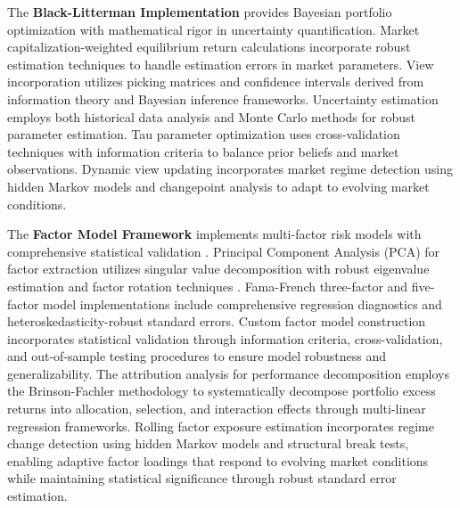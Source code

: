 \documentclass[12pt,a4paper]{article}
\theoremstyle{definition}
\theoremstyle{remark}
\begin{document}
The \textbf{Black-Litterman Implementation} provides Bayesian portfolio optimization with mathematical rigor in uncertainty quantification. Market capitalization-weighted equilibrium return calculations incorporate robust estimation techniques to handle estimation errors in market parameters. View incorporation utilizes picking matrices and confidence intervals derived from information theory and Bayesian inference frameworks. Uncertainty estimation employs both historical data analysis and Monte Carlo methods for robust parameter estimation. Tau parameter optimization uses cross-validation techniques with information criteria to balance prior beliefs and market observations. Dynamic view updating incorporates market regime detection using hidden Markov models and changepoint analysis to adapt to evolving market conditions.

The \textbf{Factor Model Framework} implements multi-factor risk models with comprehensive statistical validation \citep{fama1993common}. Principal Component Analysis (PCA) for factor extraction utilizes singular value decomposition with robust eigenvalue estimation and factor rotation techniques \citep{tsay2010analysis}. Fama-French three-factor and five-factor model implementations include comprehensive regression diagnostics and heteroskedasticity-robust standard errors. Custom factor model construction incorporates statistical validation through information criteria, cross-validation, and out-of-sample testing procedures to ensure model robustness and generalizability. The attribution analysis for performance decomposition employs the Brinson-Fachler methodology to systematically decompose portfolio excess returns into allocation, selection, and interaction effects through multi-linear regression frameworks. Rolling factor exposure estimation incorporates regime change detection using hidden Markov models and structural break tests, enabling adaptive factor loadings that respond to evolving market conditions while maintaining statistical significance through robust standard error estimation.
\end{document}
